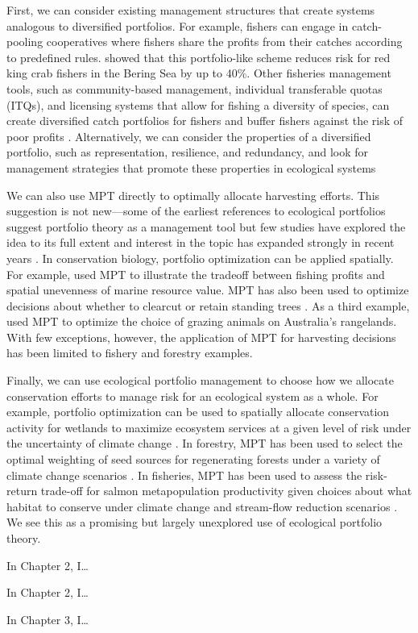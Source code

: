 First, we can consider existing management structures that create systems analogous to diversified portfolios. For example, fishers can engage in catch-pooling cooperatives where fishers share the profits from their catches according to predefined rules. \citet{sethi2012} showed that this portfolio-like scheme reduces risk for red king crab fishers in the Bering Sea by up to 40\%. Other fisheries management tools, such as community-based management, individual transferable quotas (ITQs), and licensing systems that allow for fishing a diversity of species, can create diversified catch portfolios for fishers and buffer fishers against the risk of poor profits \citep{hilborn2001, kasperski2013}. Alternatively, we can consider the properties of a diversified portfolio, such as representation, resilience, and redundancy, and look for management strategies that promote these properties in ecological systems \citep{haak2012}

We can also use MPT directly to optimally allocate harvesting efforts. This suggestion is not new---some of the earliest references to ecological portfolios suggest portfolio theory as a management tool \citep{baldursson1997, costanza2000} but few studies have explored the idea to its full extent and interest in the topic has expanded strongly in recent years \citep[e.g.][]{edwards2004, sanchirico2008, halpern2011, moloney2011}. In conservation biology, portfolio optimization can be applied spatially. For example, \citet{halpern2011} used MPT to illustrate the tradeoff between fishing profits and spatial unevenness of marine resource value. MPT has also been used to optimize decisions about whether to clearcut or retain standing trees \citep{hyytiainen2008, hildebrandt2011}. As a third example, \citet{moloney2011} used MPT to optimize the choice of grazing animals on Australia's rangelands. With few exceptions, however, the application of MPT for harvesting decisions has been limited to fishery and forestry examples.

Finally, we can use ecological portfolio management to choose how we allocate conservation efforts to manage risk for an ecological system as a whole. For example, portfolio optimization can be used to spatially allocate conservation activity for wetlands to maximize ecosystem services at a given level of risk under the uncertainty of climate change \citep{ando2011, ando2012}. In forestry, MPT has been used to select the optimal weighting of seed sources for regenerating forests under a variety of climate change scenarios \citep{crowe2008}. In fisheries, MPT has been used to assess the risk-return trade-off for salmon metapopulation productivity given choices about what habitat to conserve under climate change and stream-flow reduction scenarios \citep{anderson2014}. We see this as a promising but largely unexplored use of ecological portfolio theory.

In Chapter 2, I\ldots{}

In Chapter 2, I\ldots{}

In Chapter 3, I\ldots{}


